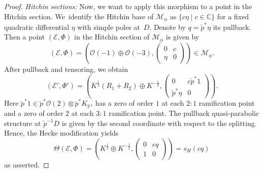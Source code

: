 \documentclass[pdftex]{sigma}
\numberwithin{equation}{section}
\theoremstyle{definition}
\newcommand{\ualpha}{\underline{\alpha}}
\newcommand{\calE}{\mathcal{E}}
\newcommand{\calM}{\mathcal{M}}
\newcommand{\calO}{\mathcal{O}}
\newcommand{\CC}{\mathbb{C}}
\newcommand{\PP}{\mathbb{P}}
\begin{document}
\begin{proof}
 \textit{Hitchin sections:} Now, we want to apply this morphism to a point in the Hitchin section. We~identify the Hitchin base of $\calM_{\ualpha}$ as $\{ c \eta \mid c \in \CC\}$ for a fixed quadratic differential $\eta$ with simple poles at~$D$. Denote by $q=\check{p}^*\eta$ its pullback. Then a point $(\calE,\Phi)$ in the Hitchin section of $\calM_{\ualpha}$ is given by
 \[ (\calE,\Phi)=\left( \calO(-1) \oplus \calO(-3), \begin{pmatrix} 0 & c \\ \eta & 0 \end{pmatrix} \right) \in \calM_{\ualpha}.
 \]
 After pullback and tensoring, we obtain
 \[ (\calE',\Phi')=\left( K^{\frac12}(R_1+R_2) \oplus K^{-\frac12}, \begin{pmatrix} 0 & c \check{p}^*1 \\ \check{p}^* \eta & 0 \end{pmatrix} \right).
 \]
 Here $\check{p}^*1 \in \check{p}^*\calO(2) \otimes \check{p}^*K_{\PP^1}$ has a zero of order $1$ at each $2:1$ ramification point and a zero of order $2$ at each $3:1$ ramification point. The pullback quasi-parabolic structure at $\check{p}^{-1}D$ is given by the second coordinate with respect to the splitting. Hence, the Hecke modification yields
 \[ \Theta(\calE,\Phi)=\left( K^{\frac12} \oplus K^{-\frac12}, \begin{pmatrix} 0 & cq \\ 1 & 0 \end{pmatrix} \right)=s_H(cq)
 \]
 as asserted.


\end{proof}
\end{document}

